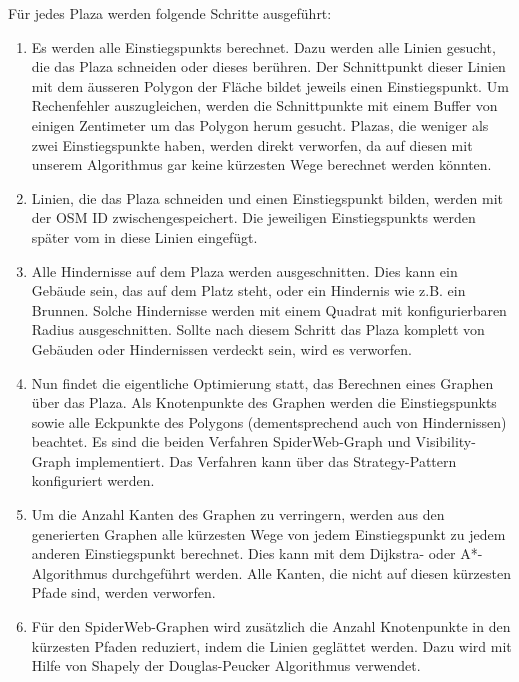 Für jedes Plaza werden folgende Schritte ausgeführt:
\begin{enumerate}
    \item Es werden alle \glspl{Einstiegspunkt} berechnet. Dazu werden alle Linien gesucht, die das Plaza schneiden oder dieses berühren. Der Schnittpunkt dieser Linien mit dem äusseren Polygon der Fläche bildet jeweils einen Einstiegspunkt. Um Rechenfehler auszugleichen, werden die Schnittpunkte mit einem Buffer von einigen Zentimeter um das Polygon herum gesucht. Plazas, die weniger als zwei Einstiegspunkte haben, werden direkt verworfen, da auf diesen mit unserem Algorithmus gar keine kürzesten Wege berechnet werden könnten.
    \item Linien, die das Plaza schneiden und einen \gls{Einstiegspunkt} bilden, werden mit der \ac{OSM} ID zwischengespeichert. Die jeweiligen \glspl{Einstiegspunkt} werden später vom  in diese Linien eingefügt.
    \item Alle Hindernisse auf dem Plaza werden ausgeschnitten. Dies kann ein Gebäude sein, das auf dem Platz steht, oder ein Hindernis wie z.B. ein Brunnen. Solche Hindernisse werden mit einem Quadrat mit konfigurierbaren Radius ausgeschnitten. Sollte nach diesem Schritt das Plaza komplett von Gebäuden oder Hindernissen verdeckt sein, wird es verworfen.
    \item Nun findet die eigentliche Optimierung statt, das Berechnen eines Graphen über das Plaza. Als Knotenpunkte des Graphen werden die \glspl{Einstiegspunkt} sowie alle Eckpunkte des Polygons (dementsprechend auch von Hindernissen) beachtet. Es sind die beiden Verfahren SpiderWeb-Graph und Visibility-Graph implementiert. Das Verfahren kann über das Strategy-Pattern \cite{gof_patterns} konfiguriert werden.
    \item Um die Anzahl Kanten des Graphen zu verringern, werden aus den generierten Graphen alle kürzesten Wege von jedem Einstiegspunkt zu jedem anderen Einstiegspunkt berechnet. Dies kann mit dem Dijkstra- \cite{dijkstra_algorithm} oder A*-Algorithmus \cite{astar} durchgeführt werden. Alle Kanten, die nicht auf diesen kürzesten Pfade sind, werden verworfen.
    \item Für den SpiderWeb-Graphen wird zusätzlich die Anzahl Knotenpunkte in den kürzesten Pfaden reduziert, indem die Linien geglättet werden. Dazu wird mit Hilfe von Shapely \cite{shapely} der Douglas-Peucker Algorithmus \cite{douglas-peucker_algorithm} verwendet.
\end{enumerate}


